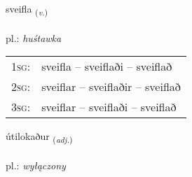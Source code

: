 \documentclass[frontgrid, backgrid]{flacards}\usepackage[]{graphicx}\usepackage[]{xcolor}
\begin{document}
\renewcommand{\flhead}{\vskip5pt \fboxsep=0pt {\small\bfseries\footnotesize Sagnorð | czasownik}}
\renewcommand{\fcfoot}{\vskip5pt \fboxsep=0pt \hspace{2pt}{\small\bfseries\footnotesize 3K}}

\renewcommand{\blhead}{\vskip5pt {\small\bfseries\footnotesize Sagnorð | czasownik }}
\renewcommand{\bcfoot}{\vskip5pt \hspace{2pt}{\small\bfseries\footnotesize 3K}}


{sveifla \small{\textsubscript{(\textit{v.})}} \\[1ex] %
\textphonetic{[sveipla]} \\
pl.: \emph{huśtawka} \\  [2ex]
\renewcommand*{\arraystretch}{0.8}
\begin{tabular}{p{1cm}l}
\textsc{1sg}: & sveifla -- sveiflaði -- sveiflað \\ 
\textsc{2sg}: & sveiflar -- sveiflaðir -- sveiflað \\ 
\textsc{3sg}: & sveiflar -- sveiflaði -- sveiflað \\ 
\end{tabular}
}

\renewcommand{\flhead}{\vskip5pt \fboxsep=0pt {\small\bfseries\footnotesize Lýsingarorð | przymiotnik}}
\renewcommand{\fcfoot}{\vskip5pt \fboxsep=0pt \hspace{2pt}{\small\bfseries\footnotesize 3K}}

\renewcommand{\blhead}{\vskip5pt {\small\bfseries\footnotesize Lýsingarorð | przymiotnik }}
\renewcommand{\bcfoot}{\vskip5pt \hspace{2pt}{\small\bfseries\footnotesize 3K}}


{útilokaður \small{\textsubscript{(\textit{adj.})}} \\[1ex] %
\textphonetic{[uːtɪlɔkaðʏr]} \\
pl.: \emph{wyłączony} \\  [2ex]
\renewcommand*{\arraystretch}{0.8}
}
\end{document}
